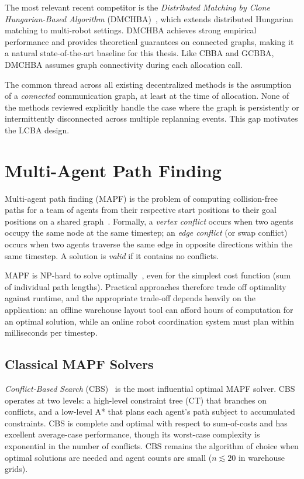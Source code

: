 The most relevant recent competitor is the \emph{Distributed Matching by Clone
Hungarian-Based Algorithm} (DMCHBA)~\cite{samiei2024dmchba}, which extends
distributed Hungarian matching to multi-robot settings.
DMCHBA achieves strong empirical performance and provides theoretical
guarantees on connected graphs, making it a natural state-of-the-art
baseline for this thesis.
Like CBBA and GCBBA, DMCHBA assumes graph connectivity during each allocation
call.

The common thread across all existing decentralized methods is the assumption
of a \emph{connected} communication graph, at least at the time of allocation.
None of the methods reviewed explicitly handle the case where the graph is
persistently or intermittently disconnected across multiple replanning events.
This gap motivates the LCBA design.


\section{Multi-Agent Path Finding}
\label{sec:bg_mapf}

Multi-agent path finding (MAPF) is the problem of computing collision-free
paths for a team of agents from their respective start positions to their goal
positions on a shared graph~\cite{stern2019mapf}.
Formally, a \emph{vertex conflict} occurs when two agents occupy the same node
at the same timestep; an \emph{edge conflict} (or swap conflict) occurs when
two agents traverse the same edge in opposite directions within the same
timestep.
A solution is \emph{valid} if it contains no conflicts.

MAPF is NP-hard to solve optimally~\cite{stern2019mapf}, even for the simplest
cost function (sum of individual path lengths).
Practical approaches therefore trade off optimality against runtime, and the
appropriate trade-off depends heavily on the application: an offline warehouse
layout tool can afford hours of computation for an optimal solution, while an
online robot coordination system must plan within milliseconds per timestep.


\subsection{Classical MAPF Solvers}
\label{subsec:bg_mapf_classical}

\emph{Conflict-Based Search} (CBS)~\cite{sharon2015conflict} is the
most influential optimal MAPF solver.
CBS operates at two levels: a high-level constraint tree (CT) that branches
on conflicts, and a low-level A* that plans each agent's path subject to
accumulated constraints.
CBS is complete and optimal with respect to sum-of-costs and has excellent
average-case performance, though its worst-case complexity is exponential in
the number of conflicts.
CBS remains the algorithm of choice when optimal solutions are needed and
agent counts are small ($n \lesssim 20$ in warehouse grids).

